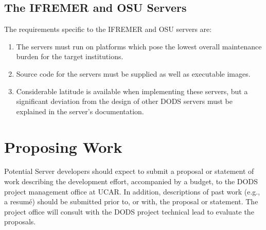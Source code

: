 \documentclass[12pt]{article}
\begin{document}
\subsection{The IFREMER and OSU Servers}

The requirements specific to the IFREMER and OSU servers are:

\begin{enumerate}

\item The servers must run on platforms which pose the lowest overall
  maintenance burden for the target institutions.
  
\item Source code for the servers must be supplied as well as executable
  images.
  
\item Considerable latitude is available when implementing these servers, but
  a significant deviation from the design of other DODS servers must be
  explained in the server's documentation.

\end{enumerate}

\section{Proposing Work}

Potential Server developers should expect to submit a proposal or statement
of work describing the development effort, accompanied by a budget, to the
DODS project management office at UCAR. In addition, descriptions of past
work (e.g., a resum\'e) should be submitted prior to,
or with, the proposal or statement. The project office will consult with
the DODS project technical lead to evaluate the proposals.
\end{document}

